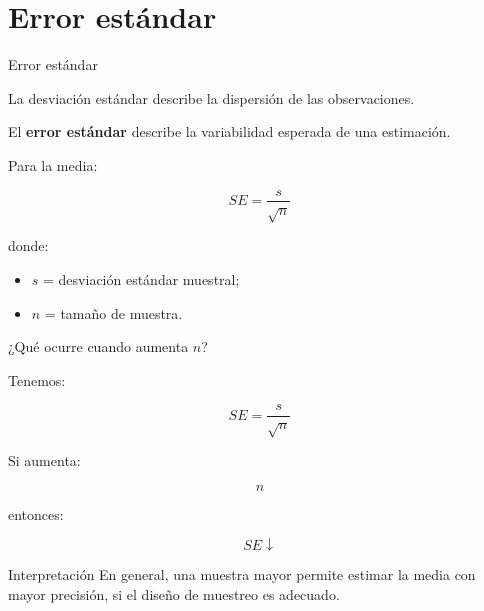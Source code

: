 \documentclass[aspectratio=169,11pt]{beamer}
\begin{document}
\section{Error estándar}

\begin{frame}{Error estándar}

La desviación estándar describe la dispersión de las observaciones.

El \textbf{error estándar} describe la variabilidad esperada de una estimación.

Para la media:

\[
SE
=
\frac{s}{\sqrt{n}}
\]

donde:

\begin{itemize}

    \item $s$ = desviación estándar muestral;

    \item $n$ = tamaño de muestra.

\end{itemize}

\end{frame}


\begin{frame}{¿Qué ocurre cuando aumenta $n$?}

Tenemos:

\[
SE
=
\frac{s}{\sqrt{n}}
\]

Si aumenta:

\[
n
\]

entonces:

\[
SE
\downarrow
\]

\vspace{0.4cm}

\begin{block}{Interpretación}
En general, una muestra mayor permite estimar la media con mayor precisión,
si el diseño de muestreo es adecuado.
\end{block}

\end{frame}

\end{document}
